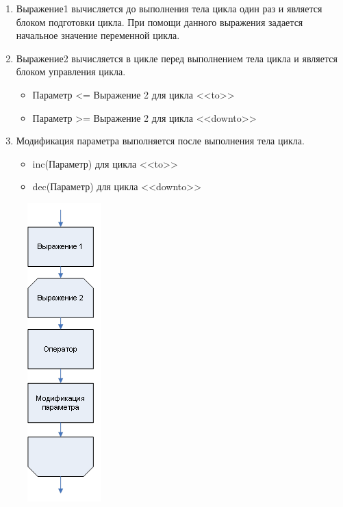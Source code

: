 \documentclass{beamer}
\begin{document}
\begin{frame}
\begin{minipage}{0.6\textwidth}
\begin{flushleft}
\begin{enumerate}
\item Выражение1 вычисляется до выполнения тела цикла один раз и является блоком подготовки цикла. При помощи данного выражения задается начальное значение переменной цикла.
\item Выражение2 вычисляется в цикле перед выполнением тела цикла и является блоком управления цикла.
\begin{itemize}
\item Параметр <= Выражение 2 для цикла <<to>>
\item Параметр >= Выражение 2 для цикла <<downto>>
\end{itemize}
\item Модификация параметра выполняется после выполнения тела цикла.
\begin{itemize}
\item inc(Параметр) для цикла <<to>>
\item dec(Параметр) для цикла <<downto>>
\end{itemize}
\end{enumerate}
\end{flushleft}
\end{minipage}
\begin{minipage}{0.2\textwidth}
\begin{flushright}
\begin{figure}[h]
\includegraphics[scale=0.7]{images/lec04-pic04.png}
\end{figure}
\end{flushright}
\end{minipage}
\end{frame}
\end{document}

